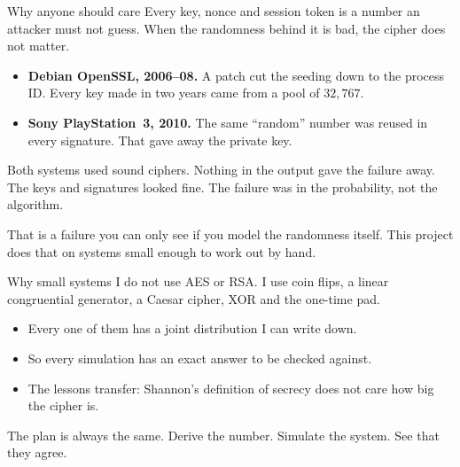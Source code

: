 \documentclass[10pt,aspectratio=169]{beamer}
\begin{document}
\begin{frame}{Why anyone should care}
  Every key, nonce and session token is a number an attacker must not
  guess. When the randomness behind it is bad, the cipher does not
  matter.
  \begin{itemize}
    \item \textbf{Debian OpenSSL, 2006--08.} A patch cut the seeding
          down to the process ID. Every key made in two years came from
          a pool of $32{,}767$.
    \item \textbf{Sony PlayStation~3, 2010.} The same ``random'' number
          was reused in every signature. That gave away the private
          key.
  \end{itemize}
  \pause
  \medskip
  Both systems used sound ciphers. Nothing in the output gave the
  failure away. The keys and signatures looked fine. The failure was in
  the probability, not the algorithm.
  \medskip

  That is a failure you can only see if you model the randomness
  itself. This project does that on systems small enough to work out by
  hand.
\end{frame}

\begin{frame}{Why small systems}
  I do not use AES or RSA. I use coin flips, a linear congruential
  generator, a Caesar cipher, XOR and the one-time pad.
  \medskip
  \begin{itemize}
    \item Every one of them has a joint distribution I can write down.
    \item So every simulation has an exact answer to be checked against.
    \item The lessons transfer: Shannon's definition of secrecy does not
          care how big the cipher is.
  \end{itemize}
  \medskip
  The plan is always the same. Derive the number. Simulate the system.
  See that they agree.
\end{frame}
\end{document}

